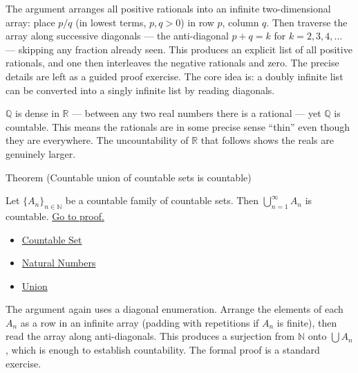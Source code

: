 \begin{remark*}
The argument arranges all positive rationals into an infinite two-dimensional
array: place $p/q$ (in lowest terms, $p,q > 0$) in row $p$, column $q$. Then
traverse the array along successive diagonals — the anti-diagonal $p + q = k$
for $k = 2, 3, 4, \dots$ — skipping any fraction already seen. This produces
an explicit list of all positive rationals, and one then interleaves the
negative rationals and zero. The precise details are left as a guided proof
exercise. The core idea is: a doubly infinite list can be converted into a
singly infinite list by reading diagonals.
\end{remark*}

\begin{remark*}
$\mathbb{Q}$ is dense in $\mathbb{R}$ — between any two real numbers there
is a rational — yet $\mathbb{Q}$ is countable. This means the rationals are
in some precise sense ``thin'' even though they are everywhere. The uncountability
of $\mathbb{R}$ that follows shows the reals are genuinely larger.
\end{remark*}

\begin{theorembox}{Theorem (Countable union of countable sets is countable)}
\begin{theorem}
\label{thm:countable-union}
Let $\{A_n\}_{n \in \mathbb{N}}$ be a countable family of countable sets.
Then $\bigcup_{n=1}^{\infty} A_n$ is countable.
\hyperref[prf:countable-union]{Go to proof.}
\end{theorem}
\end{theorembox}

\begin{dependencies}
\begin{itemize}
  \item \hyperref[def:countable]{Countable Set}
  \item \hyperref[def:natural-numbers]{Natural Numbers}
  \item \hyperref[def:union]{Union}
\end{itemize}
\end{dependencies}

\begin{remark*}
The argument again uses a diagonal enumeration. Arrange the elements of each
$A_n$ as a row in an infinite array (padding with repetitions if $A_n$ is
finite), then read the array along anti-diagonals. This produces a surjection
from $\mathbb{N}$ onto $\bigcup A_n$, which is enough to establish
countability. The formal proof is a standard exercise.
\end{remark*}

